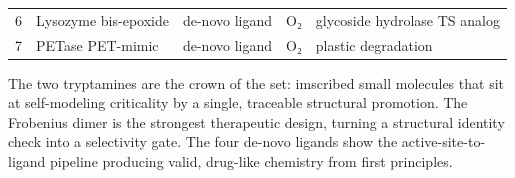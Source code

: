 \documentclass[12pt,a4paper]{article}
\begin{document}
\begin{longtable}[]{@{}lllll@{}}
\begin{minipage}[t]{0.06\columnwidth}
6\strut
\end{minipage} & \begin{minipage}[t]{0.20\columnwidth}\raggedright
Lysozyme bis-epoxide\strut
\end{minipage} & \begin{minipage}[t]{0.16\columnwidth}\raggedright
de-novo ligand\strut
\end{minipage} & \begin{minipage}[t]{0.12\columnwidth}\raggedright
O₂\strut
\end{minipage} & \begin{minipage}[t]{0.31\columnwidth}\raggedright
glycoside hydrolase TS analog\strut
\end{minipage}\tabularnewline
\begin{minipage}[t]{0.06\columnwidth}\raggedright
7\strut
\end{minipage} & \begin{minipage}[t]{0.20\columnwidth}\raggedright
PETase PET-mimic\strut
\end{minipage} & \begin{minipage}[t]{0.16\columnwidth}\raggedright
de-novo ligand\strut
\end{minipage} & \begin{minipage}[t]{0.12\columnwidth}\raggedright
O₂\strut
\end{minipage} & \begin{minipage}[t]{0.31\columnwidth}\raggedright
plastic degradation\strut
\end{minipage}\tabularnewline
\bottomrule
\end{longtable}

The two tryptamines are the crown of the set: imscribed small molecules
that sit at self-modeling criticality by a single, traceable structural
promotion. The Frobenius dimer is the strongest therapeutic design,
turning a structural identity check into a selectivity gate. The four
de-novo ligands show the active-site-to-ligand pipeline producing valid,
drug-like chemistry from first principles.
\end{document}
